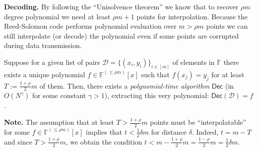 \documentclass[../lecture-notes-148x210.tex]{subfiles}
\begin{document}
\textbf{Decoding.} By following the ``Unisolvence theorem'' we know that to
recover $\rho m$ degree polynomial we need at least $\rho m + 1$ points for
interpolation. Because the Reed-Solomon code performs polynomial evaluation over
$m > \rho m$ points we can still interpolate (or decode) the polynomial even if
some points are corrupted during data transmission.

\begin{theorem}
Suppose for a given list of pairs $\mathcal{D} = \{(x_i, y_i)\}_{i \in [m]}$ of
elements in $\mathbb{F}$ there exists a unique polynomial $f \in
\mathbb{F}^{(\leq \rho m)}[x]$ such that $f(x_j) = y_j$ for at least $T :=
\frac{1+\rho}{2}m$ of them. Then, there exists a \textit{polynomial-time
algorithm} $\mathsf{Dec}$ (in $O(N^{\gamma})$ for some constant $\gamma>1$),
extracting this very polynomial: $\mathsf{Dec}(\mathcal{D}) = f$.
\end{theorem}

\textbf{Note.} The assumption that at least $T > \frac{1+\rho}{2}m$ points must
be ``interpolatable'' for some $f \in \mathbb{F}^{(\leq \rho m)}[x]$ implies
that $t < \frac{1}{2}\delta m$ for distance $\delta$. Indeed, $t = m - T$ and
since $T>\frac{1+\rho}{2}m$, we obtain the condition $t < m - \frac{1+\rho}{2}m
= \frac{1-\rho}{2}m = \frac{1}{2}\delta m$.
\end{document}
